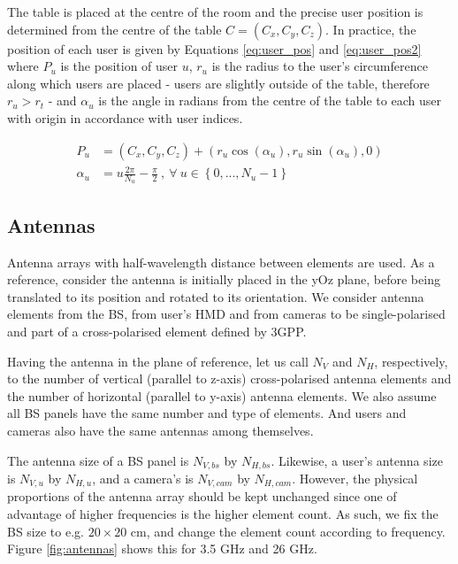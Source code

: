 \vspace{.6cm}

The table is placed at the centre of the room and the precise user position is determined from the centre of the table $C = (C_x, C_y, C_z)$. In practice, the position of each user is given by Equations \eqref{eq:user_pos} and \eqref{eq:user_pos2} where $P_u$ is the position of user $u$, $r_u$ is the radius to the user's circumference along which users are placed - users are slightly outside of the table, therefore $r_u > r_t$ - and $\alpha_u$ is the angle in radians from the centre of the table to each user with origin in accordance with user indices. 

\begin{align} 
    P_u &= (C_x, C_y, C_z) + (r_u \cos(\alpha_u), r_u \sin(\alpha_u), 0) \label{eq:user_pos} \\
    \alpha_u &= u  \frac{2 \pi}{N_u} - \frac{\pi}{2} \ , \ \forall \ u \in \left\{0, ..., N_u - 1\right\} \label{eq:user_pos2}
\end{align}

\subsection{Antennas}
\label{sec:modelling_antennas}
Antenna arrays with half-wavelength distance between elements are used. As a reference, consider the antenna is initially placed in the yOz plane, before being translated to its position and rotated to its orientation. We consider antenna elements from the \ac{BS}, from user's \ac{HMD} and from cameras to be single-polarised and part of a cross-polarised element defined by 3GPP. 

Having the antenna in the plane of reference, let us call $N_V$ and $N_H$, respectively, to the number of vertical (parallel to z-axis) cross-polarised antenna elements and the number of horizontal (parallel to y-axis) antenna elements. We also assume all BS panels have the same number and type of elements. And users and cameras also have the same antennas among themselves. 

The antenna size of a \ac{BS} panel is $N_{V,bs}$ by $N_{H,bs}$. Likewise, a user's antenna size is $N_{V,u}$ by $N_{H,u}$, and a camera's is $N_{V,cam}$ by $N_{H,cam}$. However, the physical proportions of the antenna array should be kept unchanged since one of advantage of higher frequencies is the higher element count. As such, we fix the BS size to e.g. $20 \times 20$ cm, and change the element count according to frequency. Figure \ref{fig:antennas} shows this for 3.5 GHz and 26 GHz.


